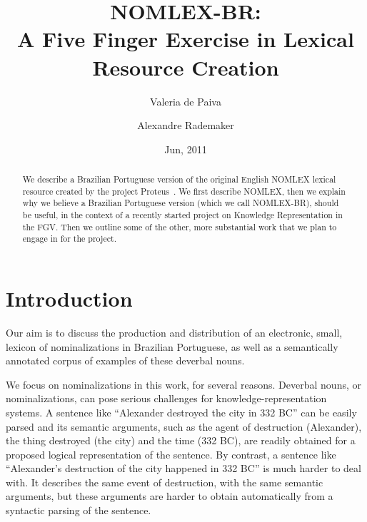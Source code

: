 \documentclass{article}
\begin{document}
\title{NOMLEX-BR: \\ A Five Finger Exercise in Lexical Resource Creation}
\author{Valeria de Paiva \and Alexandre Rademaker}
\date{Jun, 2011}
\maketitle

\begin{abstract} 
  We describe a Brazilian Portuguese version of the original English
  NOMLEX lexical resource created by the project
  Proteus~\cite{nomlex98}. We first describe NOMLEX, then we explain
  why we believe a Brazilian Portuguese version (which we call
  NOMLEX-BR), should be useful, in the context of a recently started
  project on Knowledge Representation in the FGV. Then we outline some
  of the other, more substantial work that we plan to engage in for
  the project.
\end{abstract}


\section{Introduction}


Our aim is to discuss the production and distribution of an
electronic, small, lexicon of nominalizations in Brazilian Portuguese,
as well as a semantically annotated corpus of examples of these
deverbal nouns.

We focus on nominalizations in this work, for several reasons.
Deverbal nouns, or nominalizations, can pose serious challenges for
knowledge-representation systems. A sentence like ``Alexander
destroyed the city in 332 BC'' can be easily parsed and its semantic
arguments, such as the agent of destruction (Alexander), the thing
destroyed (the city) and the time (332 BC), are readily obtained for a
proposed logical representation of the sentence. By contrast, a
sentence like ``Alexander's destruction of the city happened in 332
BC'' is much harder to deal with. It describes the same event of
destruction, with the same semantic arguments, but these arguments are
harder to obtain automatically from a syntactic parsing of the
sentence.
\end{document}
